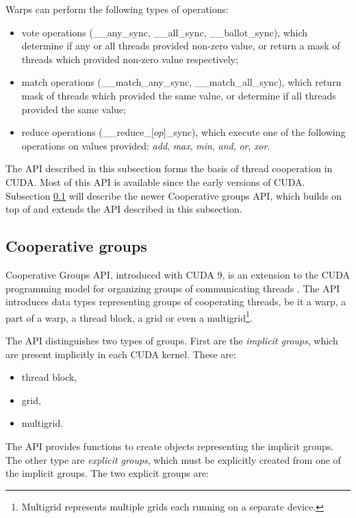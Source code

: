 Warps can perform the following types of operations:
\begin{itemize}
	\item vote operations (\_\_any\_sync, \_\_all\_sync, \_\_ballot\_sync), which determine if any or all threads provided non-zero value, or return a mask of threads which provided non-zero value respectively;
	\item match operations (\_\_match\_any\_sync, \_\_match\_all\_sync), which return mask of threads which provided the same value, or determine if all threads provided the same value;
	\item reduce operations (\_\_reduce\_$\lbrack op \rbrack$\_sync), which execute one of the following operations on values provided: \textit{add}, \textit{max}, \textit{min}, \textit{and}, \textit{or}, \textit{xor}.
\end{itemize}


The API described in this subsection forms the basis of thread cooperation in CUDA. Most of this API is available since the early versions of CUDA. Subsection \ref{sec:cooperative_groups} will describe the newer Cooperative groups API, which builds on top of and extends the API described in this subsection.

\subsection{Cooperative groups}
\label{sec:cooperative_groups}

Cooperative Groups API, introduced with CUDA 9, is an extension to the CUDA programming model for organizing groups of communicating threads \citep{site:cuda}. The API introduces data types representing groups of cooperating threads, be it a warp, a part of a warp, a thread block, a grid or even a multigrid\footnote{Multigrid represents multiple grids each running on a separate device.}.


The API distinguishes two types of groups. First are the \textit{implicit groups}, which are present implicitly in each CUDA kernel. These are:

\begin{itemize}
	\item thread block,
	\item grid,
	\item multigrid.
\end{itemize}

The API provides functions to create objects representing the implicit groups. 
The other type are \textit{explicit groups}, which must be explicitly created from one of the implicit groups. The two explicit groups are:

